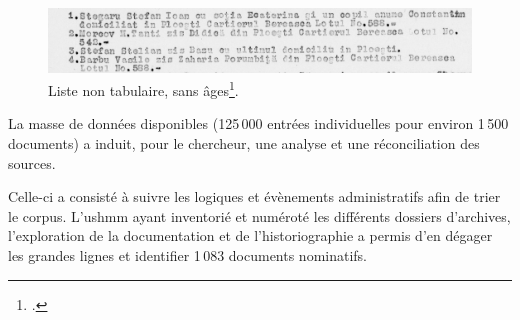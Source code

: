 \documentclass[a4paper,12pt,twoside]{book}
\begin{document}
                \begin{figure}[!ht]
        			\centering
                    \includegraphics[width=13cm]{images/rg_25_050m_0012_00000534.jpg}
                    \caption{Liste non tabulaire, sans âges\footcite[][Copyright \textit{Arhivele Naţionale ale României}]{rg-25.050mfileid:46521SelectedRecordsVarious}.}
                    \label{fig9}
                \end{figure}
			    
			    \pagebreak
			    
			     La masse de données disponibles (125\,000 entrées individuelles pour environ 1\,500 documents) a induit, pour le chercheur, une analyse et une réconciliation des sources.
                
                Celle-ci a consisté à suivre les logiques et évènements administratifs afin de trier le corpus. L’\gls{ushmm} ayant inventorié et numéroté les différents dossiers d'archives, l’exploration de la documentation et de l’historiographie a permis d'en dégager les grandes lignes et identifier 1\,083 documents nominatifs.
                \newline
\end{document}
